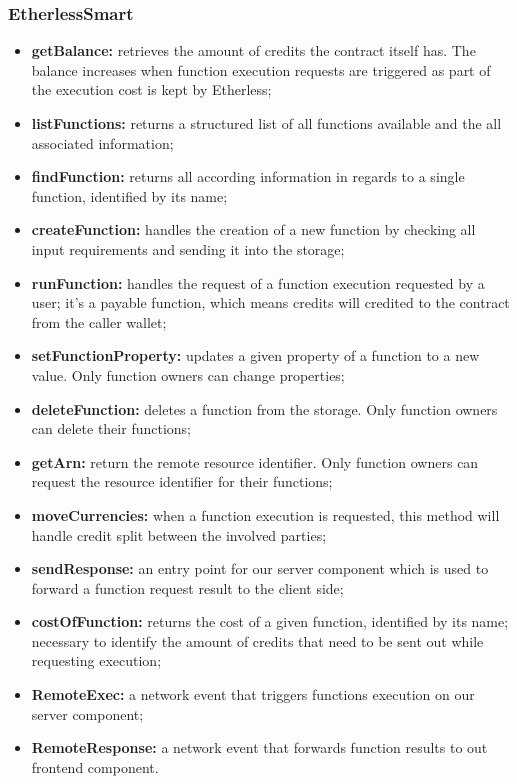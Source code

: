 \subsubsection{EtherlessSmart}
\begin{itemize}
	\item \textbf{getBalance:} retrieves the amount of credits the contract itself has. The balance increases when function execution requests are triggered as part of the execution cost is kept by Etherless;
	\item \textbf{listFunctions:} returns a structured list of all functions available and the all associated information;
	\item \textbf{findFunction:} returns all according information in regards to a single function, identified by its name;
	\item \textbf{createFunction:} handles the creation of a new function by checking all input requirements and sending it into the storage;
	\item \textbf{runFunction:} handles the request of a function execution requested by a user; it's a payable function, which means credits will credited to the contract from the caller wallet;
	\item \textbf{setFunctionProperty:} updates a given property of a function to a new value. Only function owners can change properties;
	\item \textbf{deleteFunction:} deletes a function from the storage. Only function owners can delete their functions;
	\item \textbf{getArn:} return the remote resource identifier. Only function owners can request the resource identifier for their functions;
	\item \textbf{moveCurrencies:} when a function execution is requested, this method will handle credit split between the involved parties;
	\item \textbf{sendResponse:} an entry point for our server component which is used to forward a function request result to the client side;
	\item \textbf{costOfFunction:} returns the cost of a given function, identified by its name; necessary to identify the amount of credits that need to be sent out while requesting execution;
	\item \textbf{RemoteExec:} a network event that triggers functions execution on our server component;
	\item \textbf{RemoteResponse:} a network event that forwards function results to out frontend component.
\end{itemize}
